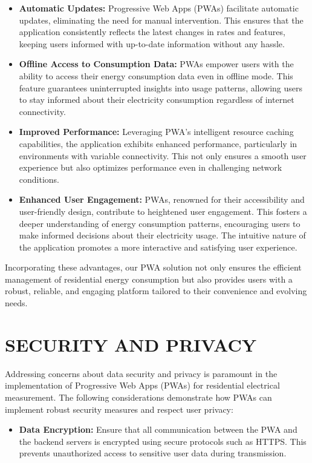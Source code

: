 \documentclass{article}
\begin{document}
\begin{multicols}{2}
\begin{itemize}
    \item \textbf{Automatic Updates:} Progressive Web Apps (PWAs) facilitate automatic updates, eliminating the need for manual intervention. This ensures that the application consistently reflects the latest changes in rates and features, keeping users informed with up-to-date information without any hassle.
    
    \item \textbf{Offline Access to Consumption Data:} PWAs empower users with the ability to access their energy consumption data even in offline mode. This feature guarantees uninterrupted insights into usage patterns, allowing users to stay informed about their electricity consumption regardless of internet connectivity.
    
    \item \textbf{Improved Performance:} Leveraging PWA's intelligent resource caching capabilities, the application exhibits enhanced performance, particularly in environments with variable connectivity. This not only ensures a smooth user experience but also optimizes performance even in challenging network conditions.
    
    \item \textbf{Enhanced User Engagement:} PWAs, renowned for their accessibility and user-friendly design, contribute to heightened user engagement. This fosters a deeper understanding of energy consumption patterns, encouraging users to make informed decisions about their electricity usage. The intuitive nature of the application promotes a more interactive and satisfying user experience.
\end{itemize}
Incorporating these advantages, our PWA solution not only ensures the efficient management of residential energy consumption but also provides users with a robust, reliable, and engaging platform tailored to their convenience and evolving needs.




\section*{SECURITY AND PRIVACY}
Addressing concerns about data security and privacy is paramount in the implementation of Progressive Web Apps (PWAs) for residential electrical measurement. The following considerations demonstrate how PWAs can implement robust security measures and respect user privacy:

\begin{itemize}
    \item \textbf{Data Encryption:} Ensure that all communication between the PWA and the backend servers is encrypted using secure protocols such as HTTPS. This prevents unauthorized access to sensitive user data during transmission.


\end{itemize}
\end{multicols}
\end{document}
